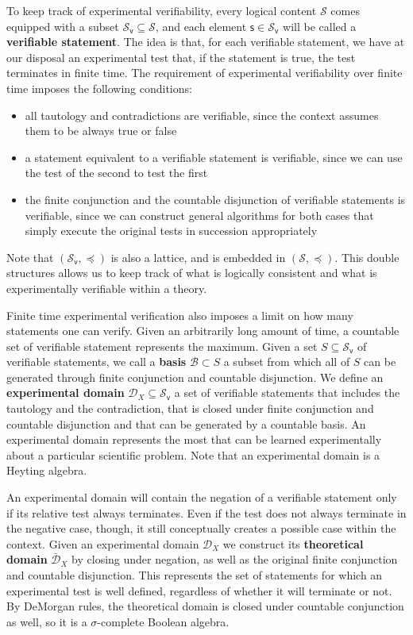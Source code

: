 \documentclass{article}
\def\logCtx{\mathcal{S}}
\def\vstmtSet{\mathcal{S}_\textsf{v}}
\newcommand{\stmt}[1][s] {\mathsf{#1}} %
\def\narrower{\preccurlyeq} %
\newcommand{\edomain}[1][D] {\mathcal{#1}} %
\newcommand{\tdomain}[1][D] {\bar{\mathcal{#1}}} %
\newcommand{\basis}[1][B] {\mathcal{#1}} %
\begin{document}
To keep track of experimental verifiability, every logical content $\logCtx$ comes equipped with a subset $\vstmtSet \subseteq \logCtx$, and each element $\stmt \in \vstmtSet$ will be called a \textbf{verifiable statement}. The idea is that, for each verifiable statement, we have at our disposal an experimental test that, if the statement is true, the test terminates in finite time. The requirement of experimental verifiability over finite time imposes the following conditions:
\begin{itemize}
	\item all tautology and contradictions are verifiable, since the context assumes them to be always true or false
	\item a statement equivalent to a verifiable statement is verifiable, since we can use the test of the second to test the first
	\item the finite conjunction and the countable disjunction of verifiable statements is verifiable, since we can construct general algorithms for both cases that simply execute the original tests in succession appropriately
\end{itemize}
Note that $(\vstmtSet, \narrower)$ is also a lattice, and is embedded in $(\logCtx, \narrower)$. This double structures allows us to keep track of what is logically consistent and what is experimentally verifiable within a theory.

Finite time experimental verification also imposes a limit on how many statements one can verify. Given an arbitrarily long amount of time, a countable set of verifiable statement represents the maximum. Given a set $S \subseteq \vstmtSet$ of verifiable statements, we call a \textbf{basis} $\basis \subset S$ a subset from which all of $S$ can be generated through finite conjunction and countable disjunction. We define an \textbf{experimental domain} $\edomain_X \subseteq \vstmtSet$ a set of verifiable statements that includes the tautology and the contradiction, that is closed under finite conjunction and countable disjunction and that can be generated by a countable basis. An experimental domain represents the most that can be learned experimentally about a particular scientific problem. Note that an experimental domain is a Heyting algebra.

An experimental domain will contain the negation of a verifiable statement only if its relative test always terminates. Even if the test does not always terminate in the negative case, though, it still conceptually creates a possible case within the context. Given an experimental domain $\edomain_X$ we construct its \textbf{theoretical domain} $\tdomain_X$ by closing under negation, as well as the original finite conjunction and countable disjunction. This represents the set of statements for which an experimental test is well defined, regardless of whether it will terminate or not. By DeMorgan rules, the theoretical domain is closed under countable conjunction as well, so it is a $\sigma$-complete Boolean algebra.
\end{document}
